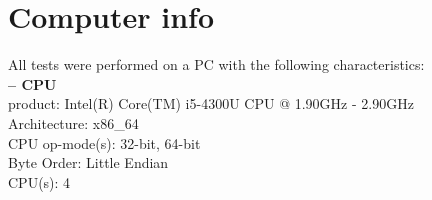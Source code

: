 \documentclass[a4paper,11pt]{report}
\begin{document}
\section{Computer info}
All tests were performed on a PC with the following characteristics:\\
\textbf{-- CPU\\}
product:\hspace{17mm}        Intel(R) Core(TM) i5-4300U CPU @ 1.90GHz - 2.90GHz\\
Architecture:\hspace{9mm}   x86\_64\\
CPU op-mode(s):\hspace{2mm}  32-bit, 64-bit\\
Byte Order:\hspace{11mm}     Little Endian\\
CPU(s):\hspace{18mm}         4\\




\end{document}
